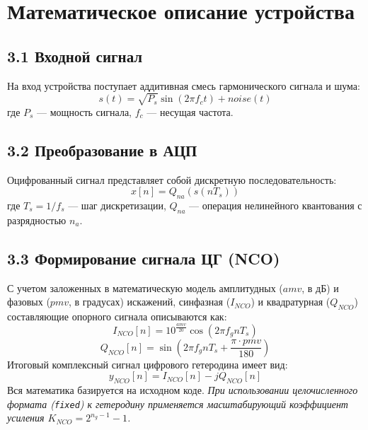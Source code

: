 
\section{Математическое описание устройства}

\subsection*{3.1 Входной сигнал}
На вход устройства поступает аддитивная смесь гармонического сигнала и шума:
\begin{equation}
    s(t) = \sqrt{P_{s}} \sin(2\pi f_c t) + noise(t)
\end{equation}
где $P_s$ — мощность сигнала, $f_c$ — несущая частота.

\subsection*{3.2 Преобразование в АЦП}
Оцифрованный сигнал представляет собой дискретную последовательность:
\begin{equation}
    x[n] = Q_{na}(s(n T_s))
\end{equation}
где $T_s = 1/f_s$ — шаг дискретизации, $Q_{na}$ — операция нелинейного квантования с разрядностью $n_a$.

\subsection*{3.3 Формирование сигнала ЦГ (NCO)}
С учетом заложенных в математическую модель амплитудных ($amv$, в дБ) и фазовых ($pmv$, в градусах) искажений, синфазная ($I_{NCO}$) и квадратурная ($Q_{NCO}$) составляющие опорного сигнала описываются как:
\begin{equation}
    I_{NCO}[n] = 10^{\frac{amv}{20}} \cos(2\pi f_g n T_s)
\end{equation}
\begin{equation}
    Q_{NCO}[n] = \sin\left(2\pi f_g n T_s + \frac{\pi \cdot pmv}{180}\right)
\end{equation}
Итоговый комплексный сигнал цифрового гетеродина имеет вид:
\begin{equation}
    y_{NCO}[n] = I_{NCO}[n] - j Q_{NCO}[n]
\end{equation}
Вся математика базируется на исходном коде. \textit{При использовании целочисленного формата (\texttt{fixed}) к гетеродину применяется масштабирующий коэффициент усиления $K_{NCO} = 2^{n_g - 1} - 1$.}

